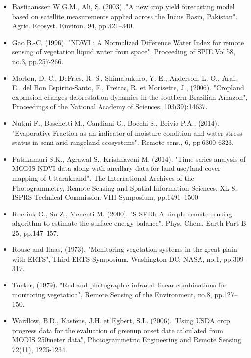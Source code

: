 \documentclass[10pt,a4paper]{article}
\begin{document}
\begin{itemize}
\item Bastiaanssen W.G.M., Ali, S. (2003). "A new crop yield forecasting model based on satellite measurements applied across the Indus Basin, Pakistan". Agric. Ecosyst. Environ. 94, pp.321–340.
\item Gao B.-C. (1996). "NDWI : A  Normalized  Difference  Water  Index  for  remote  sensing  of vegetation liquid water from space", Proceeding of SPIE.Vol.58, no.3, pp.257-266.
\item Morton, D. C., DeFries, R. S., Shimabukuro, Y. E., Anderson, L. O., Arai, E., del Bon Espirito-Santo, F.,  Freitas,  R.  et  Morisette,  J.,  (2006). "Cropland expansion changes deforestation dynamics in the southern Brazilian Amazon", Proceedings of the National Academy of Sciences, 103(39):14637. 
\item Nutini F., Boschetti M., Candiani G., Bocchi S., Brivio P.A., (2014). "Evaporative Fraction as an indicator of moisture condition and water stress status in semi-arid rangeland ecosystems". Remote sens., 6, pp.6300-6323.
\item Patakamuri S.K., Agrawal S., Krishnaveni M. (2014). "Time-series analysis of MODIS NDVI data along with ancillary data for land use/land cover mapping of Uttarakhand". The International Archives of the Photogrammetry, Remote Sensing and Spatial Information Sciences. XL-8, ISPRS Technical Commission VIII Symposium, pp.1491–1500
\item Roerink G., Su Z., Menenti M. (2000). "S-SEBI: A simple remote sensing algorithm to estimate the surface energy balance". Phys. Chem. Earth Part B 25, pp.147–157.
\item Rouse and Haas, (1973). "Monitoring vegetation systems in the great plain with ERTS", Third ERTS Symposium, Washington DC: NASA, no.1, pp.309-317.
\item Tucker, (1979). "Red and photographic infrared linear combinations for monitoring vegetation", Remote Sensing of the Environment, no.8, pp.127–150. 
\item Wardlow, B.D., Kastens, J.H. et Egbert, S.L. (2006). "Using USDA crop progress data for the evaluation of greenup onset date calculated from MODIS 250meter data", Photogrammetric Engineering and Remote Sensing 72(11), 1225-1234. 
\end{itemize}
\end{document}
